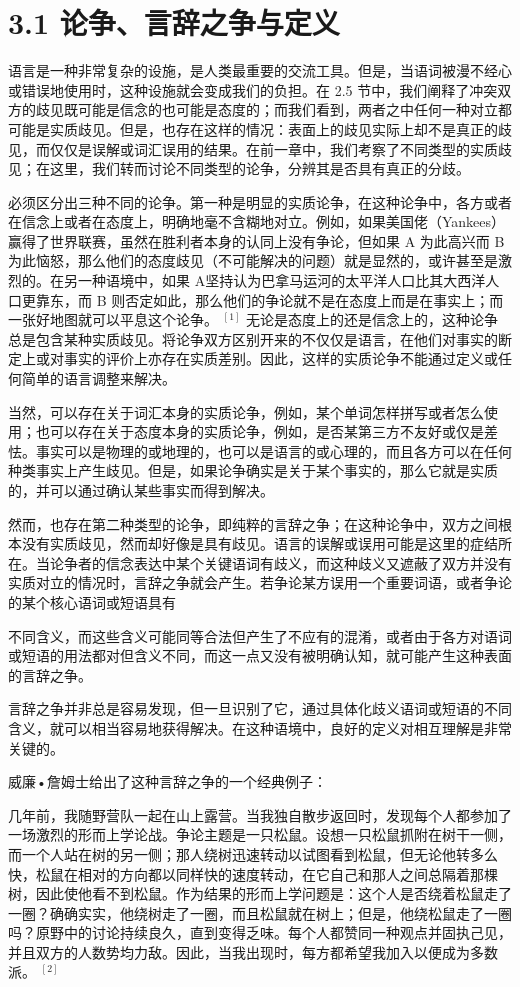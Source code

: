\section*{3.1 论争、言辞之争与定义}
语言是一种非常复杂的设施，是人类最重要的交流工具。但是，当语词被漫不经心或错误地使用时，这种设施就会变成我们的负担。在 2.5 节中，我们阐释了冲突双方的歧见既可能是信念的也可能是态度的；而我们看到，两者之中任何一种对立都可能是实质歧见。但是，也存在这样的情况：表面上的歧见实际上却不是真正的歧见，而仅仅是误解或词汇误用的结果。在前一章中，我们考察了不同类型的实质歧见；在这里，我们转而讨论不同类型的论争，分辨其是否具有真正的分歧。

必须区分出三种不同的论争。第一种是明显的实质论争，在这种论争中，各方或者在信念上或者在态度上，明确地毫不含糊地对立。例如，如果美国佬（Yankees）赢得了世界联赛，虽然在胜利者本身的认同上没有争论，但如果 A 为此高兴而 B 为此恼怒，那么他们的态度歧见（不可能解决的问题）就是显然的，或许甚至是激烈的。在另一种语境中，如果 A坚持认为巴拿马运河的太平洋人口比其大西洋人口更靠东，而 B 则否定如此，那么他们的争论就不是在态度上而是在事实上；而一张好地图就可以平息这个论争。 ${ }^{[1]}$ 无论是态度上的还是信念上的，这种论争总是包含某种实质歧见。将论争双方区别开来的不仅仅是语言，在他们对事实的断定上或对事实的评价上亦存在实质差别。因此，这样的实质论争不能通过定义或任何简单的语言调整来解决。

当然，可以存在关于词汇本身的实质论争，例如，某个单词怎样拼写或者怎么使用；也可以存在关于态度本身的实质论争，例如，是否某第三方不友好或仅是差怯。事实可以是物理的或地理的，也可以是语言的或心理的，而且各方可以在任何种类事实上产生歧见。但是，如果论争确实是关于某个事实的，那么它就是实质的，并可以通过确认某些事实而得到解决。

然而，也存在第二种类型的论争，即纯粹的言辞之争；在这种论争中，双方之间根本没有实质歧见，然而却好像是具有歧见。语言的误解或误用可能是这里的症结所在。当论争者的信念表达中某个关键语词有歧义，而这种歧义又遮蔽了双方并没有实质对立的情况时，言辞之争就会产生。若争论某方误用一个重要词语，或者争论的某个核心语词或短语具有

不同含义，而这些含义可能同等合法但产生了不应有的混淆，或者由于各方对语词或短语的用法都对但含义不同，而这一点又没有被明确认知，就可能产生这种表面的言辞之争。

言辞之争并非总是容易发现，但一旦识别了它，通过具体化歧义语词或短语的不同含义，就可以相当容易地获得解决。在这种语境中，良好的定义对相互理解是非常关键的。

威廉•詹姆士给出了这种言辞之争的一个经典例子：

几年前，我随野营队一起在山上露营。当我独自散步返回时，发现每个人都参加了一场激烈的形而上学论战。争论主题是一只松鼠。设想一只松鼠抓附在树干一侧，而一个人站在树的另一侧；那人绕树迅速转动以试图看到松鼠，但无论他转多么快，松鼠在相对的方向都以同样快的速度转动，在它自己和那人之间总隔着那棵树，因此使他看不到松鼠。作为结果的形而上学问题是：这个人是否绕着松鼠走了一圈？确确实实，他绕树走了一圈，而且松鼠就在树上；但是，他绕松鼠走了一圈吗？原野中的讨论持续良久，直到变得乏味。每个人都赞同一种观点并固执己见，并且双方的人数势均力敌。因此，当我出现时，每方都希望我加入以便成为多数派。 ${ }^{[2]}$

